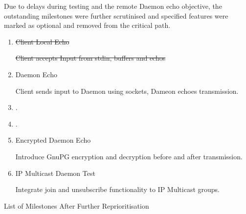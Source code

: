 Due to delays during testing and the remote Daemon echo objective, the 
outstanding milestones were further scrutinised and specified features
were marked as optional and removed from the critical path.


\begin{table}[Hbt]

\begin{center}

\begin{enumerate}

\item \sout{Client Local Echo}

	\subitem \sout{Client accepts Input from stdin, buffers and echos}

\item Daemon Echo 

	\subitem Client sends input to Daemon using sockets, Dameon 
	echoes transmission.

\item {}

	\subitem {}.

\item {}

	\subitem {}.

\item Encrypted Daemon Echo 

	\subitem Introduce GnuPG encryption and decryption before and after 
	transmission.

\item IP Multicast Daemon Test

	\subitem Integrate join and unsubscribe functionality to IP Multicast
	groups.

\end{enumerate}

\end{center}

\caption{List of Milestones After Further Reprioritisation}

\end{table}
